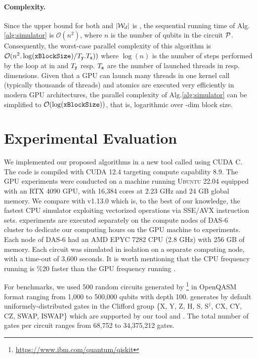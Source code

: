 \documentclass[runningheads]{llncs}
\begin{document}
\paragraph{Complexity.}
Since the upper bound for both \tableauHeight and $|\mathcal{W}_d|$ is \numQubits, the sequential running time of Alg.\ref{alg:simulator} is $\mathcal{O}(n^2)$, where $n$ is the number of qubits in the circuit $\mathcal{P}$. Consequently, the worst-case parallel complexity of this algorithm is $\mathcal{O}(n^2.\log(\texttt{xBlockSize})/ T_{\textbf{\texttt{y}}} . T_{\textbf{\texttt{x}}}))$ where $\log(n)$ is the number of steps performed by the loop at  in \collapseSigns and $T_{\textbf{\texttt{y}}}$ resp. $T_{\textbf{\texttt{x}}}$ are the number of launched threads in  resp.  dimensions. Given that a GPU can launch many threads in one kernel call (typically thousands of threads) and atomics are executed very efficiently in modern GPU architectures, the parallel complexity of Alg.\ref{alg:simulator} can be simplified to $\mathcal{O}(\log(\texttt{xBlockSize}))$, that is, logarithmic over -dim block size.

\section{Experimental Evaluation}\label{sec:experiments}

We implemented our proposed algorithms in a new tool called \quasarq using CUDA C\code{++}. The code is compiled with CUDA 12.4 targeting compute capability 8.9. 
The GPU experiments were conducted on a machine running \textsc{Ubuntu 22.04} equipped with an RTX 4090 GPU, with 16,384 cores at 2.23 GHz and 24 GB
global memory. 
We compare with \stim \cite{stim} v1.13.0 which is, to the best of our knowledge, the fastest CPU simulator exploiting vectorized operations via SSE/AVX instruction sets.
\stim experiments are executed separately on the compute nodes of DAS-6~\cite{DAS6} cluster to dedicate our computing hours on the GPU machine to \quasarq experiments. Each node of DAS-6 had an AMD EPYC 7282 CPU (2.8 GHz) with 256 GB of memory. Each circuit was simulated in isolation on a separate computing node, with a time-out of 3,600 seconds. It is worth mentioning that the CPU frequency running \stim is \%20 faster than the GPU frequency running \quasarq. 

For benchmarks, we used 500 random circuits generated by \qiskit\footnote{\url{https://www.ibm.com/quantum/qiskit}} in OpenQASM format \cite{openqasm} ranging from 1,000 to 500,000 qubits with depth 100. \qiskit generates by default uniformely-distributed gates in the Clifford group \{X, Y, Z, H, S, S$^\dagger$, CX, CY, CZ, SWAP, ISWAP\} which are supported by our tool and \stim. The total number of gates per circuit ranges from 68,752 to 34,375,212 gates.
\end{document}
